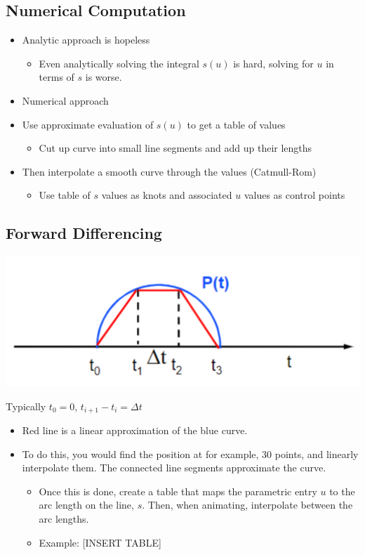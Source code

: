 \documentclass{article}
\begin{document}
\subsection*{Numerical Computation}
\begin{itemize}
    \item Analytic approach is hopeless
    \begin{itemize}
        \item Even analytically solving the integral $s(u)$ is hard, solving for $u$ in terms of $s$ is worse.
    \end{itemize}
    \item Numerical approach
    \item Use approximate evaluation of $s(u)$ to get a table of values
    \begin{itemize}
        \item Cut up curve into small line segments and add up their lengths
    \end{itemize}
    \item Then interpolate a smooth curve through the values (Catmull-Rom)
    \begin{itemize}
        \item Use table of $s$ values as knots and associated $u$ values as control points
    \end{itemize}
\end{itemize}

\subsection*{Forward Differencing}
\begin{center}
    \includegraphics*[scale=0.8]{W4_2.png}
\end{center}

Typically $t_0 = 0$, $t_{i + 1} - t_i = \Delta t$\\
\begin{itemize}
    \item Red line is a linear approximation of the blue curve.
    \item To do this, you would find the position at for example, 30 points, and linearly interpolate them.  The connected line segments approximate the curve.
    \begin{itemize}
        \item Once this is done, create a table that maps the parametric entry $u$ to the arc length on the line, $s$.  Then, when animating, interpolate between the arc lengths.
        \item Example:
            [INSERT TABLE]
    \end{itemize}
\end{itemize}
\end{document}
